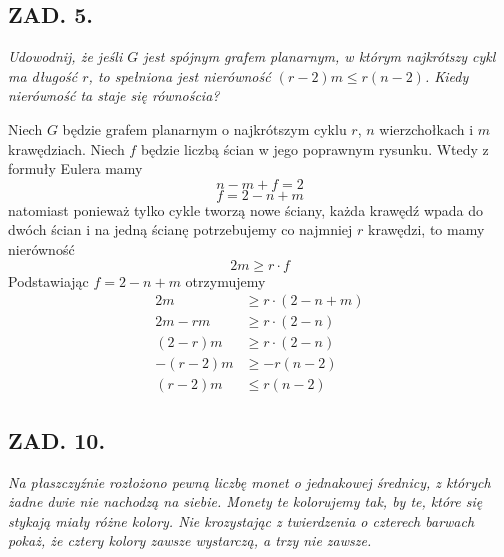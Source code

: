\documentclass{article}
\begin{document}
\subsection*{ZAD. 5.}
\emph{Udowodnij, że jeśli $G$ jest spójnym grafem planarnym, w którym najkrótszy cykl ma długość $r$, to spełniona jest nierówność $(r-2)m\leq r(n-2)$. Kiedy nierówność ta staje się równościa?}
\medskip

\medskip

Niech $G$ będzie grafem planarnym o najkrótszym cyklu $r$, $n$ wierzchołkach i $m$ krawędziach. Niech $f$ będzie liczbą ścian w jego poprawnym rysunku. Wtedy z formuły Eulera mamy
$$n-m+f=2$$
$$f=2-n+m$$
natomiast ponieważ tylko cykle tworzą nowe ściany, każda krawędź wpada do dwóch ścian i na jedną ścianę potrzebujemy co najmniej $r$ krawędzi, to mamy nierówność
$$2m\geq r\cdot f$$
Podstawiając $f=2-n+m$ otrzymujemy
\begin{align*}
    2m&\geq r\cdot (2-n+m)\\
    2m-rm&\geq r\cdot(2-n)\\
    (2-r)m&\geq r\cdot(2-n)\\
    -(r-2)m&\geq -r(n-2)\\
    (r-2)m&\leq r(n-2)
\end{align*}

\subsection*{ZAD. 10.}
\emph{Na płaszczyźnie rozłożono pewną liczbę monet o jednakowej średnicy, z których żadne dwie nie nachodzą na siebie. Monety te kolorujemy tak, by te, które się stykają miały różne kolory. Nie krozystając z twierdzenia o czterech barwach pokaż, że cztery kolory zawsze wystarczą, a trzy nie zawsze.}
\medskip

\medskip
\end{document}
